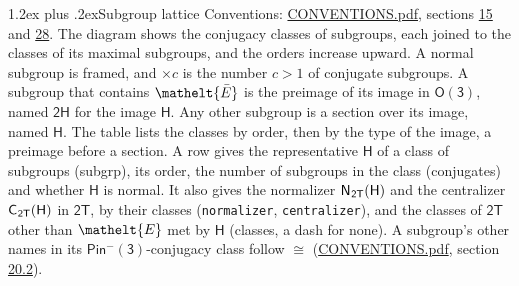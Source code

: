 \documentclass[10pt,a4paper]{article}
\makeatletter
\renewcommand\section{\@startsection{section}{1}{\z@}{-3ex plus -1ex minus -.2ex}%
  {1.2ex plus .2ex}{\normalfont\large\sffamily\bfseries\color{parttitle}}}
\numberwithin{equation}{section}
\newcommand{\eltfont}[1]{{\let\sigma\eltsigma\mathelt{#1}}}
\newcommand{\grp}[1]{\mathsf{#1}}
\newcommand{\cls}[1]{\eltfont{#1}}
\newcommand{\elt}[1]{\eltfont{#1}}
\newcommand{\samecls}{\cong}
\newcommand{\nconj}[1]{{\scriptsize$\times#1$}}
\newcommand{\barred}[1]{\bar{#1}}
\newcommand{\hairsp}{\mkern1mu}
\makeatother
\begin{document}
\section{Subgroup lattice}\label{s:subgroups}
Conventions: \href{../../CONVENTIONS.pdf}{CONVENTIONS.pdf}, sections \href{../../../rotation/CONVENTIONS.pdf\#conv.15}{15} and \href{../../CONVENTIONS.pdf\#conv.28}{28}.
The diagram shows the conjugacy classes of subgroups, each joined to the classes of its maximal subgroups, and the orders increase upward. A normal subgroup is framed, and ${\times}c$ is the number $c > 1$ of conjugate subgroups. \label{n:group.H}A subgroup that contains $\elt{\barred{E}}$ is the preimage of its image in $\grp{O(3)}$, named $\grp{2H}$ for the image $\grp{H}$. Any other subgroup is a section over its image, named $\grp{H}$. The table lists the classes by order, then by the type of the image, a preimage before a section. \label{n:head.subgroup}\label{n:head.order}\label{n:head.conjugates}\label{n:head.normal}A row gives the representative $\grp{H}$ of a class of subgroups (subgrp), its order, the number of subgroups in the class (conjugates) and whether $\grp{H}$ is normal. \label{n:group.normalizer}\label{n:group.centralizer}\label{n:head.classes}It also gives the normalizer $\grp{N}_{\hairsp \grp{2T}}(\grp{H})$ and the centralizer $\grp{C}_{\hairsp \grp{2T}}(\grp{H})$ in $\grp{2T}$, by their classes (\texttt{normalizer}, \texttt{centralizer}), and the classes of $\grp{2T}$ other than $\cls{E}$ met by $\grp{H}$ (classes, a dash for none). A subgroup's other names in its \href{Pinminus3.pdf}{$\grp{Pin^{-}(3)}$}-conjugacy class follow $\samecls$ (\href{../../CONVENTIONS.pdf}{CONVENTIONS.pdf}, section \href{../../CONVENTIONS.pdf\#conv.20.2}{20.2}).
\begin{center}
\end{center}
\end{document}
